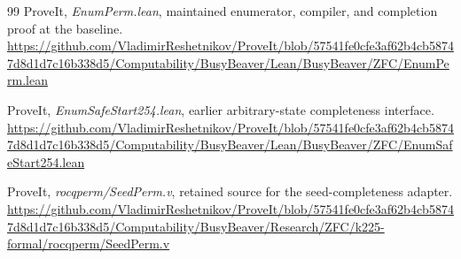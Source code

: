 \documentclass[11pt]{article}
\begin{document}
\begin{thebibliography}{99}
 ProveIt, \emph{EnumPerm.lean}, maintained enumerator,
compiler, and completion proof at the baseline.\newline
\url{https://github.com/VladimirReshetnikov/ProveIt/blob/57541fe0cfe3af62b4cb58747d8d1d7c16b338d5/Computability/BusyBeaver/Lean/BusyBeaver/ZFC/EnumPerm.lean}

 ProveIt, \emph{EnumSafeStart254.lean}, earlier
arbitrary-state completeness interface.\newline
\url{https://github.com/VladimirReshetnikov/ProveIt/blob/57541fe0cfe3af62b4cb58747d8d1d7c16b338d5/Computability/BusyBeaver/Lean/BusyBeaver/ZFC/EnumSafeStart254.lean}

 ProveIt, \emph{rocqperm/SeedPerm.v}, retained source for
the seed-completeness adapter.\newline
\url{https://github.com/VladimirReshetnikov/ProveIt/blob/57541fe0cfe3af62b4cb58747d8d1d7c16b338d5/Computability/BusyBeaver/Research/ZFC/k225-formal/rocqperm/SeedPerm.v}
\end{thebibliography}
\end{document}
